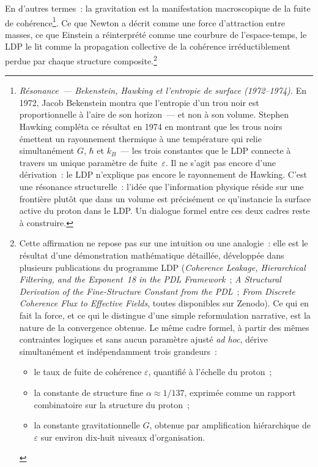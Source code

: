 \documentclass[12pt, a4paper, openright]{book}
\begin{document}
\medskip

En d'autres termes~: la gravitation est la manifestation macroscopique de la fuite de cohérence\footnote{\textit{Résonance~--- Bekenstein, Hawking et l'entropie de surface (1972--1974).} En 1972, Jacob Bekenstein montra que l'entropie d'un trou noir est proportionnelle à l'aire de son horizon~--- et non à son volume. Stephen Hawking compléta ce résultat en 1974 en montrant que les trous noirs émettent un rayonnement thermique à une température qui relie simultanément $G$, $\hbar$ et $k_B$~--- les trois constantes que le LDP connecte à travers un unique paramètre de fuite~$\varepsilon$. Il ne s'agit pas encore d'une dérivation~: le LDP n'explique pas encore le rayonnement de Hawking. C'est une résonance structurelle~: l'idée que l'information physique réside sur une frontière plutôt que dans un volume est précisément ce qu'instancie la surface active du proton dans le LDP\@. Un dialogue formel entre ces deux cadres reste à construire.}. Ce que Newton a décrit comme une force d'attraction entre masses, ce que Einstein a réinterprété comme une courbure de l'espace-temps, le LDP le lit comme la propagation collective de la cohérence irréductiblement perdue par chaque structure composite.\footnote{%
  Cette affirmation ne repose pas sur une intuition ou une analogie~: elle est le résultat d'une démonstration mathématique détaillée, développée dans plusieurs publications du programme LDP (\textit{Coherence Leakage, Hierarchical Filtering, and the Exponent~18 in the PDL Framework}~; \textit{A Structural Derivation of the Fine-Structure Constant from the PDL}~; \textit{From Discrete Coherence Flux to Effective Fields}, toutes disponibles sur Zenodo). Ce qui en fait la force, et ce qui le distingue d'une simple reformulation narrative, est la nature de la convergence obtenue. Le même cadre formel, à partir des mêmes contraintes logiques et sans aucun paramètre ajusté \emph{ad hoc}, dérive simultanément et indépendamment trois grandeurs~:
  \begin{itemize}
  \item le taux de fuite de cohérence $\varepsilon$, quantifié à l'échelle du proton~;
  \item la constante de structure fine $\alpha \approx 1/137$, exprimée comme un rapport combinatoire sur la structure du proton~;
  \item la constante gravitationnelle $G$, obtenue par amplification hiérarchique de $\varepsilon$ sur environ dix-huit niveaux d'organisation.
  \end{itemize}
}
\end{document}
